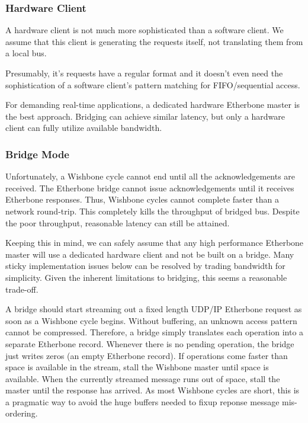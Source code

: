 \documentclass{article}
\begin{document}
\subsubsection{Hardware Client}

A hardware client is not much more sophisticated than a software client.
We assume that this client is generating the requests itself,
not translating them from a local bus.

Presumably, 
it's requests have a regular format 
and it doesn't even need the sophistication of 
a software client's pattern matching for FIFO/sequential access.

For demanding real-time applications,
a dedicated hardware Etherbone master is the best approach.
Bridging can achieve similar latency,
but only a hardware client can fully utilize available bandwidth.

\subsubsection{Bridge Mode}
\label{sec:bridge}

Unfortunately, 
a Wishbone cycle cannot end until all the acknowledgements are received.
The Etherbone bridge cannot issue acknowledgements until 
it receives Etherbone responses.
Thus, Wishbone cycles cannot complete faster than a network round-trip.
This completely kills the throughput of bridged bus.
Despite the poor throughput, 
reasonable latency can still be attained.

Keeping this in mind,
we can safely assume that any high performance Etherbone master will use 
a dedicated hardware client and not be built on a bridge.
Many sticky implementation issues below can be resolved by 
trading bandwidth for simplicity.
Given the inherent limitations to bridging,
this seems a reasonable trade-off.

A bridge should start streaming out a fixed length UDP/IP Etherbone 
request as soon as a Wishbone cycle begins.
Without buffering,
an unknown access pattern cannot be compressed.
Therefore, 
a bridge simply translates each operation into a separate Etherbone record.
Whenever there is no pending operation,
the bridge just writes zeros (an empty Etherbone record).
If operations come faster than space is available in the stream,
stall the Wishbone master until space is available.
When the currently streamed message runs out of space,
stall the master until the response has arrived.
As most Wishbone cycles are short,
this is a pragmatic way to avoid the huge buffers needed to 
fixup reponse message mis-ordering.
\end{document}
